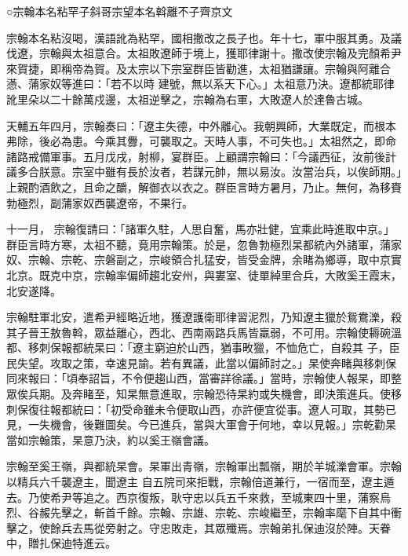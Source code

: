 
\begin{pinyinscope}

 ○宗翰本名粘罕子斜哥宗望本名斡離不子齊京文



 宗翰本名粘沒喝，漢語訛為粘罕，國相撒改之長子也。年十七，軍中服其勇。及議伐遼，宗翰與太祖意合。太祖敗遼師于境上，獲耶律謝十。撒改使宗翰及完顏希尹來賀捷，即稱帝為賀。及太宗以下宗室群臣皆勸進，太祖猶謙讓。宗翰與阿離合懣、蒲家奴等進曰：「若不以時
 建號，無以系天下心。」太祖意乃決。遼都統耶律訛里朵以二十餘萬戍邊，太祖逆擊之，宗翰為右軍，大敗遼人於達魯古城。



 天輔五年四月，宗翰奏曰：「遼主失德，中外離心。我朝興師，大業既定，而根本弗除，後必為患。今乘其釁，可襲取之。天時人事，不可失也。」太祖然之，即命諸路戒備軍事。五月戊戌，射柳，宴群臣。上顧謂宗翰曰：「今議西征，汝前後計議多合朕意。宗室中雖有長於汝者，若謀元帥，無以易汝。汝當治兵，以俟師期。」上親酌酒飲之，且命之釂，解御衣以衣之。群臣言時方暑月，乃止。無何，為移賚勃極烈，副蒲家奴西襲遼帝，不果行。



 十一月，
 宗翰復請曰：「諸軍久駐，人思自奮，馬亦壯健，宜乘此時進取中京。」群臣言時方寒，太祖不聽，竟用宗翰策。於是，忽魯勃極烈杲都統內外諸軍，蒲家奴、宗翰、宗乾、宗磐副之，宗峻領合扎猛安，皆受金牌，余睹為鄉導，取中京實北京。既克中京，宗翰率偏師趨北安州，與婁室、徒單綽里合兵，大敗奚王霞末，北安遂降。



 宗翰駐軍北安，遣希尹經略近地，獲遼護衛耶律習泥烈，乃知遼主獵於鴛鴦濼，殺其子晉王敖魯斡，眾益離心，西北、西南兩路兵馬皆羸弱，不可用。宗翰使耨碗溫都、移刺保報都統杲曰：「遼主窮迫於山西，猶事畋獵，不恤危亡，自殺其
 子，臣民失望。攻取之策，幸速見諭。若有異議，此當以偏師討之。」杲使奔睹與移刺保同來報曰：「頃奉詔旨，不令便趨山西，當審詳徐議。」當時，宗翰使人報杲，即整眾俟兵期。及奔睹至，知杲無意進取，宗翰恐待杲約或失機會，即決策進兵。使移刺保復往報都統曰：「初受命雖未令便取山西，亦許便宜從事。遼人可取，其勢已見，一失機會，後難圖矣。今已進兵，當與大軍會于何地，幸以見報。」宗乾勸杲當如宗翰策，杲意乃決，約以奚王嶺會議。



 宗翰至奚王嶺，與都統杲會。杲軍出青嶺，宗翰軍出瓢嶺，期於羊城濼會軍。宗翰以精兵六千襲遼主，聞遼主
 自五院司來拒戰，宗翰倍道兼行，一宿而至，遼主遁去。乃使希尹等追之。西京復叛，耿守忠以兵五千來救，至城東四十里，蒲察烏烈、谷赧先擊之，斬首千餘。宗翰、宗雄、宗乾、宗峻繼至，宗翰率麾下自其中衝擊之，使餘兵去馬從旁射之。守忠敗走，其眾殲焉。宗翰弟扎保迪沒於陣。天眷中，贈扎保迪特進云。




\end{pinyinscope}
